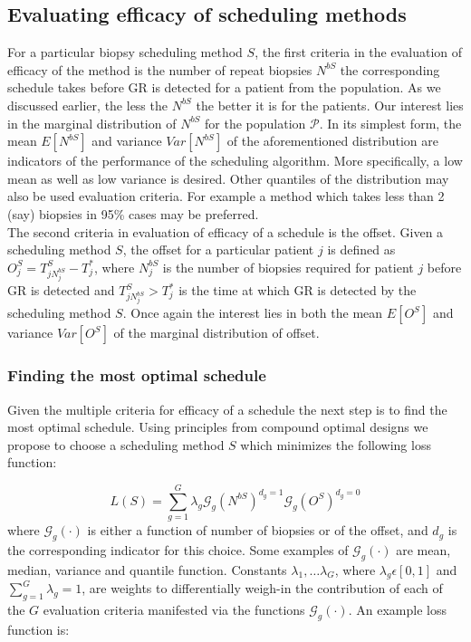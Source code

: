 \subsection{Evaluating efficacy of scheduling methods}
For a particular biopsy scheduling method $S$, the first criteria in the evaluation of efficacy of the method is the number of repeat biopsies $N^{bS}$ the corresponding schedule takes before GR is detected for a patient from the population. As we discussed earlier, the less the $N^{bS}$ the better it is for the patients. Our interest lies in the marginal distribution of $N^{bS}$ for the population $\mathcal{P}$. In its simplest form, the mean $E[N^{bS}]$ and variance $Var[N^{bS}]$ of the aforementioned distribution are indicators of the performance of the scheduling algorithm. More specifically, a low mean as well as low variance is desired. Other quantiles of the distribution may also be used evaluation criteria. For example a method which takes less than 2 (say) biopsies in 95\% cases may be preferred.\\

The second criteria in evaluation of efficacy of a schedule is the offset. Given a scheduling method $S$, the offset for a particular patient $j$ is defined as $O^S_j = T^S_{j{N^{bS}_j}} - T^*_j$, where $N^{bS}_j$ is the number of biopsies required for patient $j$ before GR is detected and $T^S_{j{N^{bS}_j}} > T^*_j$ is the time at which GR is detected by the scheduling method $S$. Once again the interest lies in both the mean $E[O^S]$ and variance $Var[O^S]$ of the marginal distribution of offset.

\subsubsection{Finding the most optimal schedule}
Given the multiple criteria for efficacy of a schedule the next step is to find the most optimal schedule. Using principles from compound optimal designs \citep{lauter1976optimal} we propose to choose a scheduling method $S$ which minimizes the following loss function:

\begin{equation}
\label{eq : loss_func_sim_study_generic}
L(S) = \sum_{g=1}^G \lambda_g \mathcal{G}_g(N^{bS})^{d_g=1}\mathcal{G}_g(O^S)^{d_g=0}
\end{equation}
where $\mathcal{G}_g(\cdot)$ is either a function of number of biopsies or of the offset, and $d_g$ is the corresponding indicator for this choice. Some examples of $\mathcal{G}_g(\cdot)$ are mean, median, variance and quantile function. Constants $\lambda_1, \ldots \lambda_G$, where $\lambda_g \epsilon [0,1]$ and $\sum_{g=1}^G \lambda_g = 1$, are weights to differentially weigh-in the contribution of each of the $G$ evaluation criteria manifested via the functions $\mathcal{G}_g(\cdot)$. An example loss function is:

